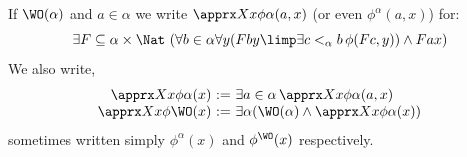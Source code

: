 \begin{definition}
If $\WO(\alpha)$ and $a \in \alpha$ we write $\apprx X x {\phi} \alpha (a,x) $ (or even $\phi^\alpha (a,x)$) for:
\[
\exists F\subseteq \alpha \times \Nat \ (\forall b \in \alpha \forall y (Fby  \limp \exists c<_\alpha b\,  \phi (Fc,y)) \land  Fax)
\]
We also write,
\[
\begin{array}{r@{\ := \ }l}
     \apprx X x \phi \alpha(x) & \exists a \in \alpha \, \apprx X x\phi \alpha(a,x) \\
     \apprx X x \phi \WO (x) & 
     \exists \alpha ( \WO(\alpha) \land  \apprx X x \phi \alpha(x) ) 
\end{array}
\]
sometimes written simply $\phi^\alpha(x)$ and $\phi^\WO(x)$ respectively.
\end{definition}




